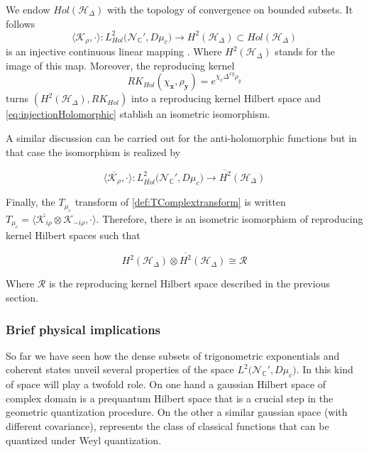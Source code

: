 \documentclass[12pt]{article}%
\begin{document}
We endow $Hol(\mathcal{H}_\Delta)$  with the topology of convergence on bounded subsets. It follows  
\begin{equation}
\label{eq:injectionHolomorphic}
\langle \mathcal{K}_{\rho},\cdot\rangle: L^2_{Hol}\big({\mathcal{N}_{\mathbb{C}}'},D\mu_c\big) \to H^2(\mathcal{H}_\Delta)\subset Hol(\mathcal{H}_\Delta) 
\end{equation}
 is an injective continuous linear mapping \cite{Oeckl2012a}. Where $H^2(\mathcal{H}_\Delta)$ stands for the image of this map. Moreover, the reproducing kernel 
\begin{equation}
\label{eq:kernel}
RK_{Hol}(\chi_{\mathbf{x}},\rho_\mathbf{y})=e^{\overline{\chi}_x\Delta^{xy}\rho_y}
\end{equation}
turns  $(H^2(\mathcal{H}_\Delta),RK_{Hol})$ into a reproducing kernel Hilbert space and \eqref{eq:injectionHolomorphic} stablish an isometric isomorphism.

A similar discussion can be carried out for the anti-holomorphic functions but in that case the isomorphism is realized by 

\begin{equation}
\label{eq:injectionAntiHolomorphic}
\langle \overline{\mathcal{K}_{\rho}},\cdot\rangle: L^2_{\overline{Hol}}\big({\mathcal{N}_{\mathbb{C}}'},D\mu_c\big) \to \overline{H^2}(\mathcal{H}_\Delta)
\end{equation}

Finally, the $T_{\mu_c}$ transform of \autoref{def:TComplextransform} is written  $T_{\mu_c}=\langle \overline{\mathcal{K}_{i\rho}}\otimes \mathcal{K}_{-i\rho} ,\cdot\rangle$. Therefore, there is an isometric isomorphism of reproducing kernel Hilbert spaces such that

\begin{equation}
\label{eq:isomorphism}
    H^2(\mathcal{H}_\Delta)\otimes \overline{H^2}(\mathcal{H}_\Delta) \cong \mathcal{R}
\end{equation}

Where $\mathcal{R}$ is the reproducing kernel Hilbert space described in the previous section.

\subsubsection{Brief physical implications}

So far we have seen how the dense subsets of trigonometric exponentials and coherent states unveil several properties of the space $L^2\big({\mathcal{N}_{\mathbb{C}}'},D\mu_c\big)$. In \cite{alonso2023a} this kind of  space will play a twofold role. On one hand a gaussian Hilbert space of complex domain is a prequantum Hilbert space that is a crucial step in the geometric quantization procedure. On the other a similar gaussian space (with different covariance), represents the class of classical functions that can be quantized under Weyl quantization.
\end{document}
